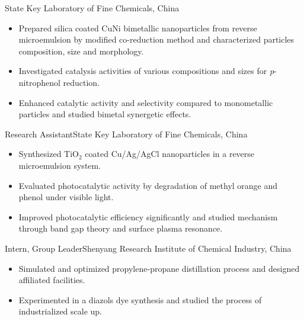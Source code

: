 \documentclass[a4paper,11pt]{article}
\begin{document}

 {State Key Laboratory of Fine Chemicals, China}{}{
\begin{itemize}
\item Prepared silica coated CuNi bimetallic nanoparticles from reverse microemulsion by modified co-reduction method and characterized particles composition, size and morphology.
\item Investigated catalysis activities of various compositions and sizes for \textit{p}-nitrophenol reduction.
\item Enhanced catalytic activity and selectivity compared to monometallic particles and studied bimetal synergetic effects.
\end{itemize}
}


 {Research Assistant}{State Key Laboratory of Fine Chemicals, China}{}{
\begin{itemize}
\item Synthesized TiO$_2$ coated Cu/Ag/AgCl nanoparticles in a reverse microemulsion system.
\item Evaluated photocatalytic activity by degradation of methyl orange and phenol under visible light.
\item Improved photocatalytic efficiency significantly and studied mechanism through band gap theory and surface plasma resonance.
\end{itemize}
}


 {Intern, Group Leader}{Shenyang Research Institute of Chemical Industry, China}{}{
\begin{itemize}
\item Simulated and optimized propylene-propane distillation process and designed affiliated facilities.
\item Experimented in a diazols dye synthesis and studied the process of industrialized scale up.
\end{itemize}
}
\end{document}
